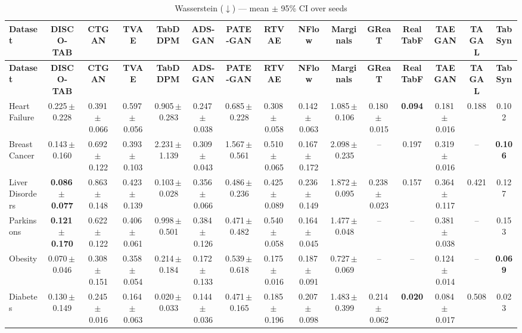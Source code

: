 \documentclass[8pt]{extarticle}
\begin{document}
\begin{longtable}{l*{14}{c}}
\caption{Wasserstein ($\downarrow$) --- mean $\pm$ 95\% CI over seeds}\\
\toprule
\textbf{Dataset} & \textbf{DISCO-TAB} & \textbf{CTGAN} & \textbf{TVAE} & \textbf{TabDDPM} & \textbf{ADS-GAN} & \textbf{PATE-GAN} & \textbf{RTVAE} & \textbf{NFlow} & \textbf{Marginals} & \textbf{GReaT} & \textbf{RealTabF} & \textbf{TAEGAN} & \textbf{TAGAL} & \textbf{TabSyn} \\
\midrule
\endfirsthead
\toprule
\textbf{Dataset} & \textbf{DISCO-TAB} & \textbf{CTGAN} & \textbf{TVAE} & \textbf{TabDDPM} & \textbf{ADS-GAN} & \textbf{PATE-GAN} & \textbf{RTVAE} & \textbf{NFlow} & \textbf{Marginals} & \textbf{GReaT} & \textbf{RealTabF} & \textbf{TAEGAN} & \textbf{TAGAL} & \textbf{TabSyn} \\
\midrule
\endhead
\bottomrule
\endfoot
Heart Failure & 0.225\,$\pm$\,0.228 & 0.391\,$\pm$\,0.066 & 0.597\,$\pm$\,0.056 & 0.905\,$\pm$\,0.283 & 0.247\,$\pm$\,0.038 & 0.685\,$\pm$\,0.228 & 0.308\,$\pm$\,0.058 & 0.142\,$\pm$\,0.063 & 1.085\,$\pm$\,0.106 & 0.180\,$\pm$\,0.015 & \textbf{0.094} & 0.181\,$\pm$\,0.016 & 0.188 & 0.102 \\
Breast Cancer & 0.143\,$\pm$\,0.160 & 0.692\,$\pm$\,0.122 & 0.393\,$\pm$\,0.103 & 2.231\,$\pm$\,1.139 & 0.309\,$\pm$\,0.043 & 1.567\,$\pm$\,0.561 & 0.510\,$\pm$\,0.065 & 0.167\,$\pm$\,0.172 & 2.098\,$\pm$\,0.235 & -- & 0.197 & 0.319\,$\pm$\,0.016 & -- & \textbf{0.106} \\
Liver Disorders & \textbf{0.086\,$\pm$\,0.077} & 0.863\,$\pm$\,0.148 & 0.423\,$\pm$\,0.139 & 0.103\,$\pm$\,0.028 & 0.356\,$\pm$\,0.066 & 0.486\,$\pm$\,0.236 & 0.425\,$\pm$\,0.089 & 0.236\,$\pm$\,0.149 & 1.872\,$\pm$\,0.095 & 0.238\,$\pm$\,0.023 & 0.157 & 0.364\,$\pm$\,0.117 & 0.421 & 0.127 \\
Parkinsons & \textbf{0.121\,$\pm$\,0.170} & 0.622\,$\pm$\,0.122 & 0.406\,$\pm$\,0.061 & 0.998\,$\pm$\,0.501 & 0.384\,$\pm$\,0.126 & 0.471\,$\pm$\,0.482 & 0.540\,$\pm$\,0.058 & 0.164\,$\pm$\,0.045 & 1.477\,$\pm$\,0.048 & -- & -- & 0.381\,$\pm$\,0.038 & -- & 0.153 \\
Obesity & 0.070\,$\pm$\,0.046 & 0.308\,$\pm$\,0.151 & 0.358\,$\pm$\,0.054 & 0.214\,$\pm$\,0.184 & 0.172\,$\pm$\,0.133 & 0.539\,$\pm$\,0.618 & 0.175\,$\pm$\,0.016 & 0.187\,$\pm$\,0.091 & 0.727\,$\pm$\,0.069 & -- & -- & 0.124\,$\pm$\,0.014 & -- & \textbf{0.069} \\
Diabetes & 0.130\,$\pm$\,0.149 & 0.245\,$\pm$\,0.016 & 0.164\,$\pm$\,0.063 & 0.020\,$\pm$\,0.033 & 0.144\,$\pm$\,0.036 & 0.471\,$\pm$\,0.165 & 0.185\,$\pm$\,0.196 & 0.207\,$\pm$\,0.098 & 1.483\,$\pm$\,0.399 & 0.214\,$\pm$\,0.062 & \textbf{0.020} & 0.084\,$\pm$\,0.017 & 0.508 & 0.023 \\

\end{longtable}
\end{document}
